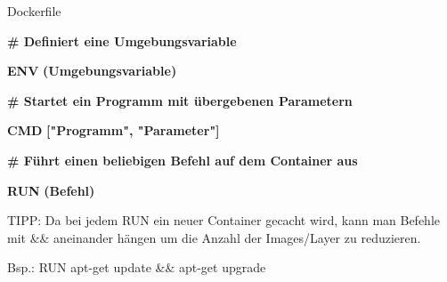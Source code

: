 \documentclass[final]{beamer}
\newlength{\onecolwid}
\begin{document}
\begin{frame}
\begin{columns}[t]
\begin{column}{\onecolwid}
\begin{block}{Dockerfile}
\vspace{1cm}
\par \textcolor{docker-green}{\textbf{\# Definiert eine Umgebungsvariable}}
\par \textcolor{docker-pu}{\textbf{ENV}} \textcolor{docker-red}{\textbf{(Umgebungsvariable)}}

\vspace{1cm}
\par \textcolor{docker-green}{\textbf{\# Startet ein Programm mit übergebenen Parametern}}
\par \textcolor{docker-pu}{\textbf{CMD}} \textcolor{docker-red}{\textbf{["Programm", "Parameter"]}}

\vspace{1cm}
\par \textcolor{docker-green}{\textbf{\# Führt einen beliebigen Befehl auf dem Container aus}}
\par \textcolor{docker-pu}{\textbf{RUN}} \textcolor{docker-red}{\textbf{(Befehl)}}

\begin{small}
\vspace{1cm}
\par TIPP: Da bei jedem RUN ein neuer Container gecacht wird, kann man Befehle mit \&\& aneinander hängen um die Anzahl der Images/Layer zu reduzieren.

\vspace{1cm}
\par Bsp.: RUN apt-get update \&\& apt-get upgrade
	
\end{small}



\vspace{3cm}


\end{block}
\end{column}
\end{columns}
\end{frame}
\end{document}
